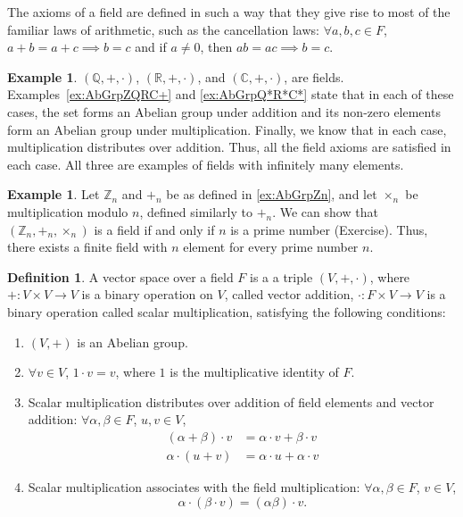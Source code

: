 \documentclass[svgnames]{article}
\theoremstyle{definition}
\newtheorem{Definition}[Theorem]{Definition}
\newtheorem{Example}[Theorem]{Example}
\theoremstyle{remark}
\newcommand{\newterm}[1]{{\color{alertcolor} #1}}
\begin{document}
The axioms of a field are defined in such a way that they give rise to most of the familiar laws of arithmetic, such as the cancellation laws: $\forall a, b, c \in F$, $a + b = a + c \implies b = c$ and if $a \ne 0$, then $ab = ac  \implies b = c$.

\begin{Example}\label{ex:FldQRC}
$(\mathbb Q, +, \cdot)$, $(\mathbb R, +, \cdot)$, and $(\mathbb C, +, \cdot)$, are fields. Examples~\ref{ex:AbGrpZQRC+} and \ref{ex:AbGrpQ*R*C*} state that in each of these cases, the set forms an Abelian group under addition and its non-zero elements form an Abelian group under multiplication. Finally, we know that in each case, multiplication distributes over addition. Thus, all the field axioms are satisfied in each case. All three are examples of fields with infinitely many elements.
\end{Example}
\begin{Example}
Let $\mathbb Z_n$ and $+_n$ be as defined in \cref{ex:AbGrpZn}, and let $\times_n$ be multiplication modulo $n$, defined similarly to $+_n$. We can show that $(\mathbb Z_n, +_n, \times _n)$ is a field if and only if $n$ is a prime number {(Exercise)}. Thus, there exists a finite field with $n$ element for every prime number $n$.
\end{Example}

\begin{Definition}
A \newterm{vector space over a field} $F$ is a a triple $(V, +, \cdot)$, where $+ \colon V \times V \to V$ is a binary operation on $V$, called \newterm{vector addition}, $\cdot \colon F \times V \to V$ is a binary operation called \newterm{scalar multiplication}, satisfying the following conditions:
\begin{enumerate}
\item\label{it:VS1} $(V, +)$ is an Abelian group.
\item\label{it:VS2} $\forall v \in V$, $1 \cdot v = v$, where $1$ is the multiplicative identity of $F$.
\item\label{it:VS3} Scalar multiplication distributes over addition of field elements and vector addition: $\forall \alpha, \beta \in F$, $u, v \in V$,
	\begin{align*}
	(\alpha + \beta) \cdot v & = \alpha \cdot v + \beta \cdot v\\
	\alpha \cdot (u + v) & = \alpha \cdot u + \alpha \cdot v
	\end{align*}
\item\label{it:VS4} Scalar multiplication associates with the field multiplication: $\forall \alpha, \beta \in F$, $v \in V$,
	\begin{equation*}
	\alpha \cdot (\beta \cdot v) = (\alpha\beta) \cdot v.
	\end{equation*}
\end{enumerate}
\end{Definition}
\end{document}
